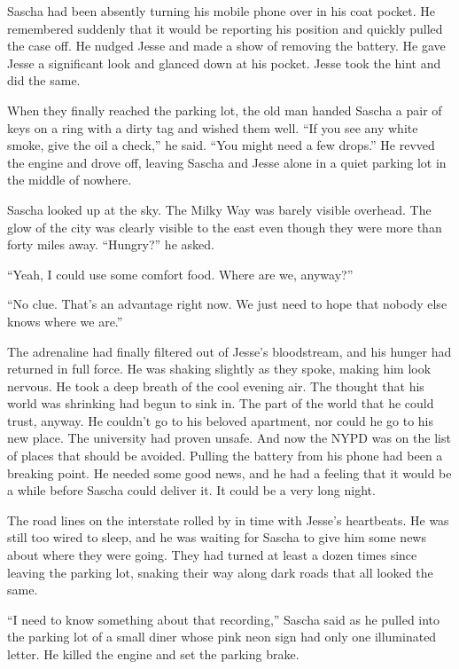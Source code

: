 \documentclass[12pt]{book}
\begin{document}
Sascha had been absently turning his mobile phone over in his coat pocket.  He remembered suddenly that it would be reporting his position and quickly pulled the case off.  He nudged Jesse and made a show of removing the battery.  He gave Jesse a significant look and glanced down at his pocket.  Jesse took the hint and did the same.

When they finally reached the parking lot, the old man handed Sascha a pair of keys on a ring with a dirty tag and wished them well.  ``If you see any white smoke, give the oil a check,'' he said.  ``You might need a few drops.''  He revved the engine and drove off, leaving Sascha and Jesse alone in a quiet parking lot in the middle of nowhere.

Sascha looked up at the sky.  The Milky Way was barely visible overhead.  The glow of the city was clearly visible to the east even though they were more than forty miles away.  ``Hungry?'' he asked.

``Yeah, I could use some comfort food.  Where are we, anyway?''

``No clue.  That's an advantage right now.  We just need to hope that nobody else knows where we are.''

The adrenaline had finally filtered out of Jesse's bloodstream, and his hunger had returned in full force.  He was shaking slightly as they spoke, making him look nervous.  He took a deep breath of the cool evening air.  The thought that his world was shrinking had begun to sink in.  The part of the world that he could trust, anyway.  He couldn't go to his beloved apartment, nor could he go to his new place.  The university had proven unsafe.  And now the NYPD was on the list of places that should be avoided.  Pulling the battery from his phone had been a breaking point.  He needed some good news, and he had a feeling that it would be a while before Sascha could deliver it.  It could be a very long night.


The road lines on the interstate rolled by in time with Jesse's heartbeats.  He was still too wired to sleep, and he was waiting for Sascha to give him some news about where they were going.  They had turned at least a dozen times since leaving the parking lot, snaking their way along dark roads that all looked the same.

``I need to know something about that recording,'' Sascha said as he pulled into the parking lot of a small diner whose pink neon sign had only one illuminated letter.  He killed the engine and set the parking brake.
\end{document}
